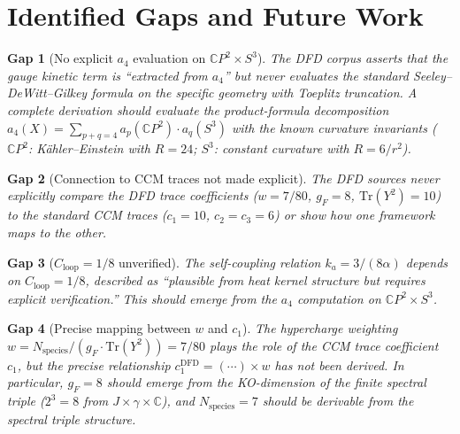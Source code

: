 \documentclass[12pt,a4paper]{article}
\newtheorem{gap}{Gap}
\begin{document}
\section{Identified Gaps and Future Work}
\label{sec:gaps}

\begin{gap}[No explicit $a_4$ evaluation on $\mathbb{C}P^2 \times S^3$]
The DFD corpus asserts that the gauge kinetic term is ``extracted from $a_4$''
but never evaluates the standard Seeley--DeWitt--Gilkey formula
on the specific geometry with Toeplitz truncation.
A complete derivation should evaluate the product-formula decomposition
$a_4(X) = \sum_{p+q=4} a_p(\mathbb{C}P^2) \cdot a_q(S^3)$ with the known
curvature invariants ($\mathbb{C}P^2$: K\"ahler--Einstein with $R = 24$;
$S^3$: constant curvature with $R = 6/r^2$).
\end{gap}

\begin{gap}[Connection to CCM traces not made explicit]
The DFD sources never explicitly compare the DFD trace coefficients
($w = 7/80$, $g_F = 8$, $\mathrm{Tr}(Y^2) = 10$) to the standard CCM traces
($c_1 = 10$, $c_2 = c_3 = 6$) or show how one framework maps to the other.
\end{gap}

\begin{gap}[$C_{\mathrm{loop}} = 1/8$ unverified]
The self-coupling relation $k_a = 3/(8\alpha)$ depends on $C_{\mathrm{loop}} = 1/8$,
described as ``plausible from heat kernel structure but requires explicit
verification.''  This should emerge from the $a_4$ computation on
$\mathbb{C}P^2 \times S^3$.
\end{gap}

\begin{gap}[Precise mapping between $w$ and $c_1$]
The hypercharge weighting $w = N_{\mathrm{species}}/(g_F \cdot \mathrm{Tr}(Y^2))
= 7/80$ plays the role of the CCM trace coefficient $c_1$, but the precise
relationship $c_1^{\mathrm{DFD}} = (\cdots) \times w$ has not been derived.
In particular, $g_F = 8$ should emerge from the KO-dimension of the finite
spectral triple ($2^3 = 8$ from $J \times \gamma \times \mathbb{C}$), and
$N_{\mathrm{species}} = 7$ should be derivable from the spectral triple structure.
\end{gap}

\end{document}
